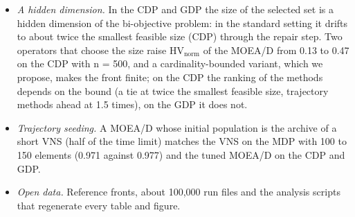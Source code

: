 \begin{itemize}
\item \emph{A hidden dimension.} In the CDP and GDP the size of the selected set is a hidden dimension of the bi-objective problem: in the standard setting it drifts to about twice the smallest feasible size (CDP) through the repair step. Two operators that choose the size raise $\mathrm{HV}_{\mathrm{norm}}$ of the MOEA/D from 0.13 to 0.47 on the CDP with n = 500, and a cardinality-bounded variant, which we propose, makes the front finite; on the CDP the ranking of the methods depends on the bound (a tie at twice the smallest feasible size, trajectory methods ahead at 1.5 times), on the GDP it does not.
\item \emph{Trajectory seeding.} A MOEA/D whose initial population is the archive of a short VNS (half of the time limit) matches the VNS on the MDP with 100 to 150 elements (0.971 against 0.977) and the tuned MOEA/D on the CDP and GDP.
\item \emph{Open data.} Reference fronts, about 100,000 run files and the analysis scripts that regenerate every table and figure.
\end{itemize}
